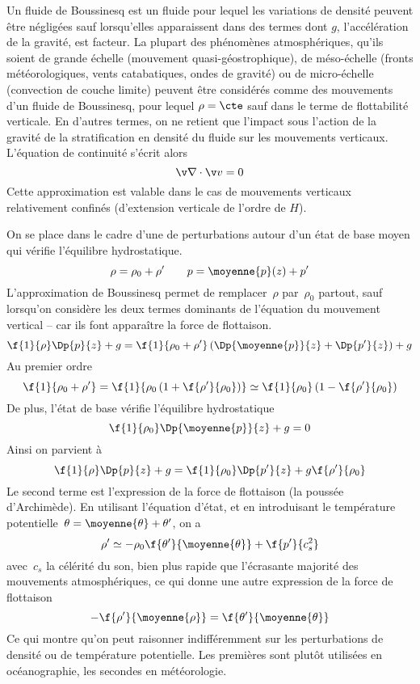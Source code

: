 \sk
Un fluide de Boussinesq est un fluide pour lequel les variations de densité peuvent être négligées 
sauf lorsqu'elles apparaissent dans des termes dont $g$, l'accélération de la gravité, est facteur.
La plupart des phénomènes atmosphériques, 
qu'ils soient de grande échelle (mouvement quasi-géostrophique),
de méso-échelle (fronts météorologiques, vents catabatiques, ondes de gravité)
ou 
de micro-échelle (convection de couche limite)
peuvent être considérés comme des mouvements
d'un fluide de Boussinesq, pour lequel $\rho=\cte$
sauf dans le terme de flottabilité verticale.
En d'autres termes, on ne retient que l'impact sous l'action de la gravité
de la stratification en densité du fluide sur les mouvements verticaux.
L'équation de continuité s'écrit alors
\[ \v \nabla \cdot \v v = 0 \]
\noindent Cette approximation est valable dans le cas de mouvements  
verticaux relativement confinés (d'extension verticale de l'ordre de $H$).

\sk
On se place dans le cadre d'une  de perturbations
autour d'un état de base moyen qui vérifie l'équilibre hydrostatique.
\[ \rho = \rho_0 + \rho' \qquad p = \moyenne{p}(z) + p' \]
L'approximation de Boussinesq permet 
de remplacer~$\rho$ par~$\rho_0$ partout, sauf 
lorsqu'on considère les deux termes dominants 
de l'équation du mouvement vertical -- car ils font apparaître la force de flottaison.
\[ 
\f{1}{\rho} \Dp{p}{z} + g 
= 
\f{1}{\rho_0 + \rho'} \left( \Dp{\moyenne{p}}{z} + \Dp{p'}{z} \right) + g  
\]
\noindent Au premier ordre
\[ 
\f{1}{\rho_0 + \rho'} 
= 
\f{1}{\rho_0 \left( 1 + \f{\rho'}{\rho_0} \right) } 
\simeq 
\f{1}{\rho_0} \left( 1 - \f{\rho'}{\rho_0} \right)
\]
\noindent De plus, l'état de base vérifie l'équilibre hydrostatique
\[ 
\f{1}{\rho_0} \Dp{\moyenne{p}}{z} + g = 0
\]
\noindent Ainsi on parvient à
\[ 
\f{1}{\rho} \Dp{p}{z} + g 
= 
\f{1}{\rho_0} \Dp{p'}{z} + g \f{\rho'}{\rho_0}
\]
\noindent Le second terme est l'expression de la force de flottaison (la poussée d'Archimède).
En utilisant l'équation d'état, et en introduisant le température
potentielle~$\theta = \moyenne{\theta} + \theta'$, on a
\[
\rho' \simeq - \rho_0 \f{\theta'}{\moyenne{\theta}} + \f{p'}{c_s^2}
\]
\noindent avec~$c_s$ la célérité du son, bien plus rapide que
l'écrasante majorité des mouvements atmosphériques, ce qui donne
une autre expression de la force de flottaison
\[
-\f{\rho'}{\moyenne{\rho}} = \f{\theta'}{\moyenne{\theta}}
\]
\noindent Ce qui montre qu'on peut raisonner indifféremment
sur les perturbations de densité ou de température potentielle.
Les premières sont plutôt utilisées en océanographie,
les secondes en météorologie.

